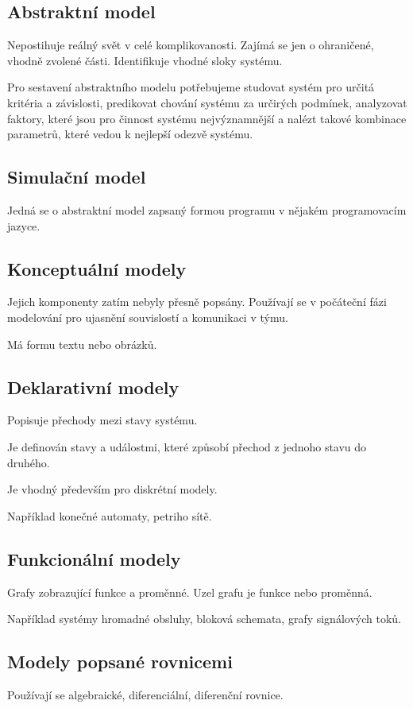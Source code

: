 \documentclass[11pt]{article}
\begin{document}
\subsection{Abstraktní model}
\label{sec:org1a8d714}
Nepostihuje reálný svět v celé komplikovanosti. Zajímá se jen o ohraničené,
vhodně zvolené části. Identifikuje vhodné sloky systému.

Pro sestavení abstraktního modelu potřebujeme studovat systém pro určitá
kritéria a závislosti, predikovat chování systému za určirých podmínek,
analyzovat faktory, které jsou pro činnost systému nejvýznamnější a nalézt
takové kombinace parametrů, které vedou k nejlepší odezvě systému.

\subsection{Simulační model}
\label{sec:orgcd26dbe}
Jedná se o abstraktní model zapsaný formou programu v nějakém programovacím
jazyce.

\subsection{Konceptuální modely}
\label{sec:orgfb58cfc}
Jejich komponenty zatím nebyly přesně popsány. Používají se v počáteční fázi
modelování pro ujasnění souvislostí a komunikaci v týmu.

Má formu textu nebo obrázků.

\subsection{Deklarativní modely}
\label{sec:org0dbf712}
Popisuje přechody mezi stavy systému.

Je definován stavy a událostmi, které způsobí přechod z jednoho stavu do
druhého.

Je vhodný především pro diskrétní modely.

Například konečné automaty, petriho sítě.

\subsection{Funkcionální modely}
\label{sec:org6fedb80}
Grafy zobrazující funkce a proměnné. Uzel grafu je funkce nebo proměnná.

Například systémy hromadné obsluhy, bloková schemata, grafy signálových toků.

\subsection{Modely popsané rovnicemi}
\label{sec:org5639dd6}
Používají se algebraické, diferenciální, diferenční rovnice.
\end{document}
